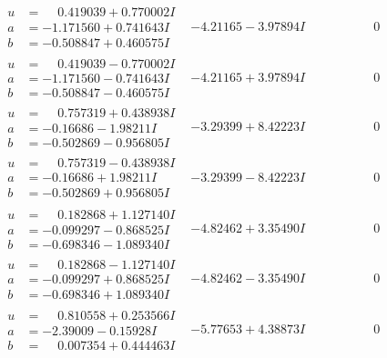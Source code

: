 \documentclass[1p]{elsarticle_modified}
\theoremstyle{definition}
\begin{document}
$$\begin{array}{c|c|c}
\begin{aligned}
u &= \phantom{-}0.419039 + 0.770002 I \\
a &= -1.171560 + 0.741643 I \\
b &= -0.508847 + 0.460575 I\end{aligned}
 & -4.21165 - 3.97894 I & \phantom{-0.000000 } 0 \\ \hline\begin{aligned}
u &= \phantom{-}0.419039 - 0.770002 I \\
a &= -1.171560 - 0.741643 I \\
b &= -0.508847 - 0.460575 I\end{aligned}
 & -4.21165 + 3.97894 I & \phantom{-0.000000 } 0 \\ \hline\begin{aligned}
u &= \phantom{-}0.757319 + 0.438938 I \\
a &= -0.16686 - 1.98211 I \\
b &= -0.502869 - 0.956805 I\end{aligned}
 & -3.29399 + 8.42223 I & \phantom{-0.000000 } 0 \\ \hline\begin{aligned}
u &= \phantom{-}0.757319 - 0.438938 I \\
a &= -0.16686 + 1.98211 I \\
b &= -0.502869 + 0.956805 I\end{aligned}
 & -3.29399 - 8.42223 I & \phantom{-0.000000 } 0 \\ \hline\begin{aligned}
u &= \phantom{-}0.182868 + 1.127140 I \\
a &= -0.099297 - 0.868525 I \\
b &= -0.698346 - 1.089340 I\end{aligned}
 & -4.82462 + 3.35490 I & \phantom{-0.000000 } 0 \\ \hline\begin{aligned}
u &= \phantom{-}0.182868 - 1.127140 I \\
a &= -0.099297 + 0.868525 I \\
b &= -0.698346 + 1.089340 I\end{aligned}
 & -4.82462 - 3.35490 I & \phantom{-0.000000 } 0 \\ \hline\begin{aligned}
u &= \phantom{-}0.810558 + 0.253566 I \\
a &= -2.39009 - 0.15928 I \\
b &= \phantom{-}0.007354 + 0.444463 I\end{aligned}
 & -5.77653 + 4.38873 I & \phantom{-0.000000 } 0 \\ \hline\begin{aligned}

\end{aligned}
\end{array}$$
\end{document}
